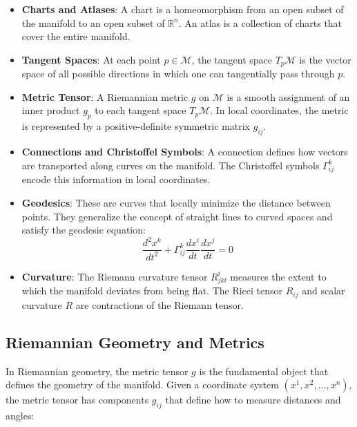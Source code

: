 \documentclass[11pt,a4paper]{article}
\newcommand{\R}{\mathbb{R}}
\newcommand{\christoffel}[3]{\Gamma^{#1}_{#2 #3}}
\begin{document}
\begin{itemize}
    \item \textbf{Charts and Atlases}: A chart is a homeomorphism from an open subset of the manifold to an open subset of $\R^n$. An atlas is a collection of charts that cover the entire manifold.
    
    \item \textbf{Tangent Spaces}: At each point $p \in \mathcal{M}$, the tangent space $T_p\mathcal{M}$ is the vector space of all possible directions in which one can tangentially pass through $p$.
    
    \item \textbf{Metric Tensor}: A Riemannian metric $g$ on $\mathcal{M}$ is a smooth assignment of an inner product $g_p$ to each tangent space $T_p\mathcal{M}$. In local coordinates, the metric is represented by a positive-definite symmetric matrix $g_{ij}$.
    
    \item \textbf{Connections and Christoffel Symbols}: A connection defines how vectors are transported along curves on the manifold. The Christoffel symbols $\christoffel{k}{i}{j}$ encode this information in local coordinates.
    
    \item \textbf{Geodesics}: These are curves that locally minimize the distance between points. They generalize the concept of straight lines to curved spaces and satisfy the geodesic equation:
    \begin{equation}
        \frac{d^2 x^k}{dt^2} + \christoffel{k}{i}{j} \frac{dx^i}{dt} \frac{dx^j}{dt} = 0
    \end{equation}
    
    \item \textbf{Curvature}: The Riemann curvature tensor $R^i_{jkl}$ measures the extent to which the manifold deviates from being flat. The Ricci tensor $R_{ij}$ and scalar curvature $R$ are contractions of the Riemann tensor.
\end{itemize}

\subsection{Riemannian Geometry and Metrics}

In Riemannian geometry, the metric tensor $g$ is the fundamental object that defines the geometry of the manifold. Given a coordinate system $(x^1, x^2, \ldots, x^n)$, the metric tensor has components $g_{ij}$ that define how to measure distances and angles:
\end{document}
